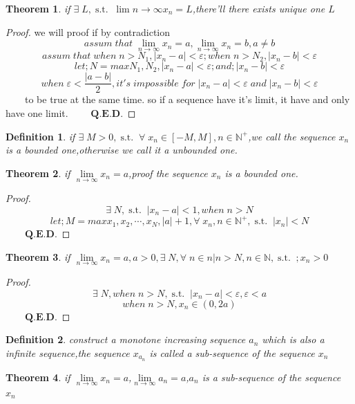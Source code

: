 \documentclass[a4paper,12pt]{report}
\newtheorem{theorem}{Theorem}[section]      %
\newtheorem{definition}{Definition}[section]     %
\newtheorem*{proof}{Proof}    %
\newcommand{\st}{\operatorname{s.t.}}
\begin{document}
\begin{theorem}
    if $\exists\; L,\st\;\lim\limits{n\rightarrow\infty}x_n=L$,there'll there exists unique one $L$
\end{theorem}
\begin{proof}
    we will proof if by contradiction
$$assum\;that\;\lim\limits_{n\rightarrow\infty}{x_n}=a,\lim\limits_{n\rightarrow\infty}{x_n}=b,a\neq b$$
$$assum\;that\;when\;n>N_1,\vert x_n-a\vert<\varepsilon;when\;n>N_2,\vert x_n-b\vert<\varepsilon$$
$$let;N=max{N_1,N_2},\vert x_n-a\vert<\varepsilon;and;\vert x_n-b\vert<\varepsilon$$
$$when\;\varepsilon<\displaystyle\frac{\vert a-b\vert}{2},it's\;impossible\;for\;\vert x_n-a\vert<\varepsilon\;and\;\vert x_n-b\vert<\varepsilon$$$\qquad$to be true at the same time.
so if a sequence have it's limit, it have and only have one limit.
$\qquad\mathbf{Q.E.D.}$
\end{proof}
\begin{definition}
    if $\exists\; M>0,\st\;\forall\; x_n\in [-M,M],n\in\mathbb{N}^+$,we call the sequence $x_n$ is a bounded one,otherwise we call it a unbounded one.
\end{definition}
\begin{theorem}
    if $\lim\limits_{n\rightarrow\infty}{x_n}=a$,proof the sequence $x_n$ is a bounded one.
\end{theorem}
\begin{proof}
    $$\exists\; N,\st\;\vert x_n-a\vert<1,when\;n>N$$
    $$let;M=max{x_1,x_2,\cdots,x_N,\vert a\vert+1},\forall\; x_n,n\in\mathbb{N}^+,\st\;\vert x_n\vert<N$$
$\qquad\mathbf{Q.E.D.}$
\end{proof}
\begin{theorem}
    if $\lim\limits_{n\rightarrow\infty}{x_n}=a,a>0,\exists\; N,\forall\; n\in{n\vert n>N,n\in\mathbb{N}},\st\;;x_n>0$ 
\end{theorem}
\begin{proof}
    $$\exists\; N,when\;n>N,\st\;\vert x_n-a\vert<\varepsilon,\varepsilon<a$$
    $$when\;n>N,x_n\in(0,2a)$$
$\qquad\mathbf{Q.E.D.}$
\end{proof}
\begin{definition}
    construct a monotone increasing sequence ${a_n}$ which is also a infinite sequence,the sequence ${x_{a_n}}$ is called a sub-sequence of the sequence ${x_n}$
\end{definition}
\begin{theorem}
    if $\lim\limits_{n\rightarrow\infty}{x_n}=a$,$\lim\limits_{n\rightarrow\infty}{a_n}=a$,${a_n}$ is a sub-sequence of the sequence ${x_n}$
\end{theorem}
\end{document}
